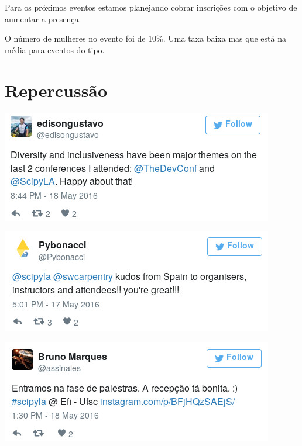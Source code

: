 \documentclass[12pt]{article}
\begin{document}
Para os próximos eventos estamos planejando cobrar inscrições com o objetivo de
aumentar a presença.

O número de mulheres no evento foi de 10\%. Uma taxa baixa mas que está na média
para eventos do tipo.

\newpage

\section*{Repercussão}

\noindent  %
\includegraphics[width=\textwidth]{tweet-diversidade.jpg}

\noindent  %
\includegraphics[width=\textwidth]{tweet-kudos.jpg}

\noindent  %
\includegraphics[width=\textwidth]{tweet-recepcao.jpg}

\newpage
\end{document}
